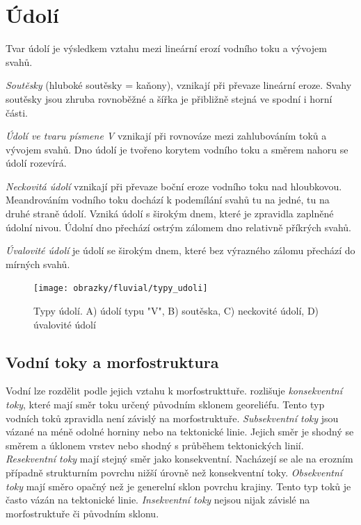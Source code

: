 \section{Údolí}

Tvar údolí je výsledkem vztahu mezi lineární erozí vodního toku a vývojem svahů.

\emph{Soutěsky} (hluboké soutěsky = kaňony), vznikají při převaze lineární eroze. Svahy soutěsky jsou zhruba rovnoběžné a šířka je přibližně stejná ve spodní i horní části.

\emph{Údolí ve tvaru písmene V} vznikají při rovnováze mezi zahlubováním toků a vývojem svahů. Dno údolí je tvořeno korytem vodního toku a směrem nahoru se údolí rozevírá. 

\emph{Neckovitá údolí} vznikají při převaze boční eroze vodního toku nad hloubkovou. Meandrováním vodního toku dochází k podemílání svahů tu na jedné, tu na druhé straně údolí. Vzniká údolí s širokým dnem, které je zpravidla zaplněné údolní nivou. Údolní dno přechází ostrým zálomem dno relativně příkrých svahů. 

\emph{Úvalovité údolí} je údolí se širokým dnem, které bez výrazného zálomu přechází do mírných svahů.

\begin{figure}[h]
	\centering
	\texttt{[image: obrazky/fluvial/typy\_udoli]}
	\caption{Typy údolí. A) údolí typu "V", B) soutěska, C) neckovité údolí, D) úvalovité údolí}
	\label{fig:typyudoli}
\end{figure}

\subsection{Vodní toky a morfostruktura}
Vodní lze rozdělit podle jejich vztahu k morfostrukttuře. \textcite{demekObecnaGeomorfologie1987} rozlišuje \emph{konsekventní toky}, které mají směr toku určený původním sklonem georeliéfu. Tento typ vodních toků zpravidla není závislý na morfostruktuře. \emph{Subsekventní toky} jsou vázané na méně odolné horniny nebo na tektonické linie. Jejich směr je shodný se směrem a úklonem vrstev nebo shodný s průběhem tektonických linií. \emph{Resekventní toky} mají stejný směr jako konsekventní. Nacházejí se ale na erozním případně strukturním povrchu nižší úrovně než konsekventní toky. \emph{Obsekventní toky} mají směro opačný než je generelní sklon povrchu krajiny. Tento typ toků je často vázán na tektonické linie. \emph{Insekventní toky} nejsou nijak závislé na morfostruktuře či původním sklonu.

